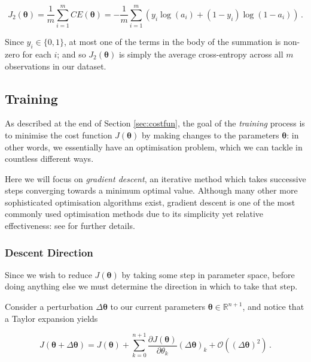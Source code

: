 \documentclass{article}[11pt]
\begin{document}
        $$
        J_2(\boldsymbol{\theta}) = \frac{1}{m} \sum_{i=1}^{m} CE(\boldsymbol{\theta}) = - \frac{1}{m} \sum_{i=1}^{m} \left( y_i \log(a_i) + (1 - y_i) \log(1 - a_i) \right) \,.
        $$
        
        Since $y_i \in \{0, 1\}$, at most one of the terms in the body of the summation is non-zero for each $i$; and so $J_2(\boldsymbol{\theta})$ is simply the average cross-entropy across all $m$ observations in our dataset.
    
    

    \subsection{Training} \label{sec:gradient_descent}
        
        As described at the end of Section \ref{sec:costfun}, the goal of the \textit{training} process is to minimise the cost function $J(\boldsymbol{\theta})$ by making changes to the parameters $\boldsymbol{\theta}$: in other words, we essentially have an optimisation problem, which we can tackle in countless different ways.
        
        Here we will focus on \textit{gradient descent}, an iterative method which takes successive steps converging towards a minimum optimal value. Although many other more sophisticated optimisation algorithms exist, gradient descent is one of the most commonly used optimisation methods due to its simplicity yet relative effectiveness: see \cite{lecun_backprop} for further details.
        
        
        \subsubsection{Descent Direction}
            
            Since we wish to reduce $J(\boldsymbol{\theta})$ by taking some step in parameter space, before doing anything else we must determine the direction in which to take that step.
            
            Consider a perturbation $\Delta \boldsymbol{\theta}$ to our current parameters $\boldsymbol{\theta} \in \mathbb{R}^{n+1}$, and notice that a Taylor expansion yields
            
            $$
            J(\boldsymbol{\theta} + \Delta \boldsymbol{\theta}) = J(\boldsymbol{\theta}) + \sum_{k=0}^{n+1} \frac{\partial J(\boldsymbol{\theta})}{\partial \theta_k} (\Delta \boldsymbol{\theta})_k + \mathcal{O} ((\Delta \boldsymbol{\theta})^2) \,.
            $$
            
\end{document}
